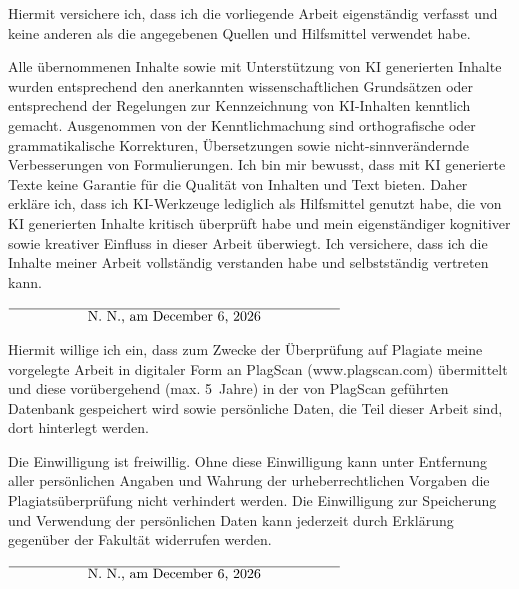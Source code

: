 \documentclass[12pt,twoside=false,a4paper,parskip]{scrbook}
\def\BaAuthor{Dein Name}
\def\ShowBaAuthor{\BaAuthor}
\def\ShowBaAuthor{N.~N.}
\begin{document}
\listoftables


\cleardoublepage
{}
{}
\printbibliography



Hiermit versichere ich, dass ich die vorliegende Arbeit eigenständig verfasst und keine anderen als die angegebenen Quellen und Hilfsmittel verwendet habe.

Alle übernommenen Inhalte sowie mit Unterstützung von KI generierten Inhalte wurden entsprechend den anerkannten wissenschaftlichen Grundsätzen oder entsprechend der Regelungen zur Kennzeichnung von KI-Inhalten kenntlich gemacht. Ausgenommen von der Kenntlichmachung sind orthografische oder grammatikalische Korrekturen, Übersetzungen sowie nicht-sinnverändernde Verbesserungen von Formulierungen. Ich bin mir bewusst, dass mit KI generierte Texte keine Garantie für die Qualität von Inhalten und Text bieten. Daher erkläre ich, dass ich KI-Werkzeuge lediglich als Hilfsmittel genutzt habe, die von KI generierten Inhalte kritisch überprüft habe und mein eigenständiger kognitiver sowie kreativer Einfluss in dieser Arbeit überwiegt. Ich versichere, dass ich die Inhalte meiner Arbeit vollständig verstanden habe und selbstständig vertreten kann.

\vspace{20pt}
\begin{flushright}
  $\overline{~~~~~~~~~~~~~~~~~\mbox{\ShowBaAuthor, am \today}~~~~~~~~~~~~~~~~~}$
\end{flushright}


Hiermit willige ich ein, dass zum Zwecke der Überprüfung auf Plagiate meine vorgelegte Arbeit in digitaler Form an PlagScan (www.plagscan.com) übermittelt und diese vorübergehend (max. 5~Jahre) in der von PlagScan geführten Datenbank gespeichert wird sowie persönliche Daten, die Teil dieser Arbeit sind, dort hinterlegt werden.

\begin{small}
  Die Einwilligung ist freiwillig. Ohne diese Einwilligung kann unter Entfernung aller persönlichen Angaben und Wahrung der urheberrechtlichen Vorgaben die Plagiatsüberprüfung nicht verhindert werden. Die Einwilligung zur Speicherung und Verwendung der persönlichen Daten kann jederzeit durch Erklärung gegenüber der Fakultät widerrufen werden.
\end{small}

\vspace{20pt}
\begin{flushright}
  $\overline{~~~~~~~~~~~~~~~~~\mbox{\ShowBaAuthor, am \today}~~~~~~~~~~~~~~~~~}$
\end{flushright}
\end{document}
